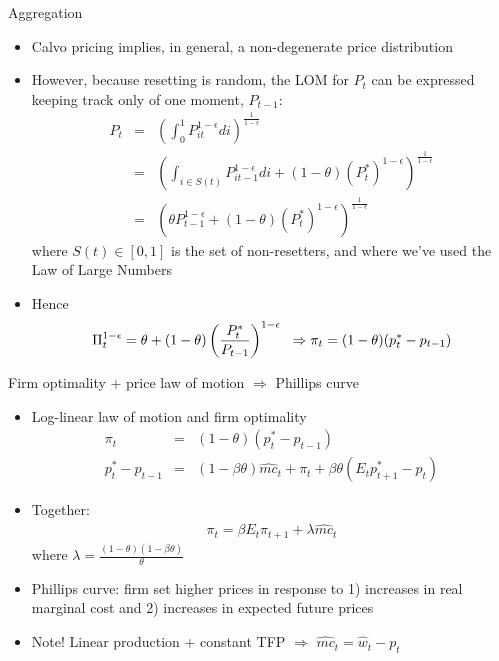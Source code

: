 \documentclass[9pt,xcolor={dvipsnames}]{beamer}
\newcommand{\bit}{\begin{itemize}}
\newcommand{\eit}{\end{itemize}}
\newcommand{\bc}{\color{blue}}
\begin{document}
\begin{frame}{Aggregation}

\bit
\setlength\itemsep{1em}

\item Calvo pricing implies, in general, a non-degenerate price distribution 

\item However, because resetting is random, the LOM for $P_t$ can be expressed keeping track only of one moment, $P_{t-1}$:
\begin{eqnarray}
P_t &=& \left(\int_{0}^{1} P_{it}^{1-\epsilon}  di\right)^{\frac{1}{1-\epsilon}} \nonumber \\
&=& \left(\int_{i \in S(t)} P_{it-1}^{1-\epsilon}  di  + (1-\theta) (P^*_t)^{1-\epsilon} \right)^{\frac{1}{1-\epsilon}} \nonumber \\
&=& \left(\theta P_{t-1}^{1-\epsilon}  + (1-\theta) (P^*_t)^{1-\epsilon} \right)^{\frac{1}{1-\epsilon}} \nonumber
\end{eqnarray} 
where $S(t) \in [0,1]$ is the set of non-resetters, and where we've used the {\bc Law of Large Numbers}

\item Hence
\begin{eqnarray}
\Pi_t^{1-\epsilon} = \theta + (1-\theta)\left(\frac{P^*_t}{P_{t-1}}\right)^{1-\epsilon} \nonumber \hspace{2mm} \Rightarrow \pi_t = (1-\theta)(p^*_t-p_{t-1}) 
\end{eqnarray}


\eit

\end{frame}

\begin{frame}{Firm optimality + price law of motion $\Rightarrow$ Phillips curve}
	
	\bit
	\setlength\itemsep{1.5em}
	
	\item Log-linear law of motion and firm optimality
	\begin{eqnarray}
	\pi_t &=& (1-\theta)(p^*_t-p_{t-1}) \nonumber \\
	p^*_t-p_{t-1} &=& (1-\beta \theta) \widehat{mc}_t + \pi_t  + \beta \theta (E_t p^*_{t+1}-p_{t}) \nonumber  
	\end{eqnarray}
	
	\item Together:
	\begin{eqnarray}
	\pi_t = \beta E_t \pi_{t+1} + \lambda \widehat{mc}_t \nonumber
	\end{eqnarray}
	where $\lambda = \frac{(1-\theta)(1-\beta \theta)}{\theta}$
		
	\item Phillips curve: firm set higher prices in response to 1) increases in real marginal cost and 2) increases in expected future prices
	
	\item Note! Linear production + constant TFP $\Rightarrow$ $\widehat{mc}_t  = \hat w_t-p_t$
	
	\eit
	
\end{frame}
\end{document}
